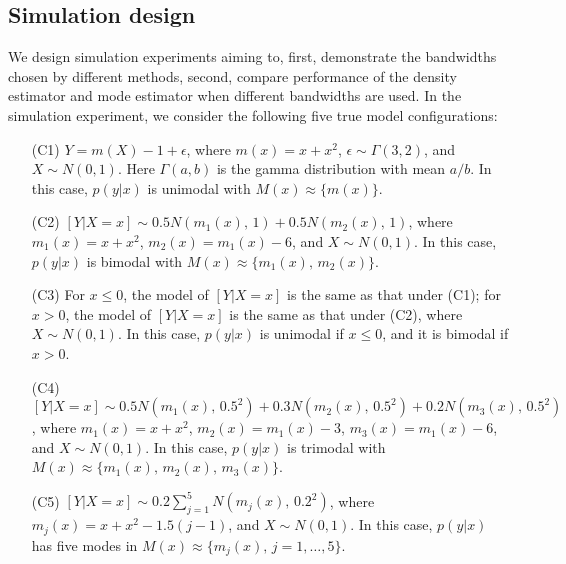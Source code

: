 \documentclass[fleqn,12pt,twoside]{article}
\numberwithin{equation}{section}
\begin{document}
\subsection{Simulation design}
We design simulation experiments aiming to, first, demonstrate the bandwidths chosen by different methods, second, compare performance of the density estimator and mode estimator when different bandwidths are used. In the simulation experiment, we consider the following five true model configurations: 
\begin{enumerate}
	\item[(C1)] $Y = m(X)-1+\epsilon$, where $m(x)=x+x^2$, $\epsilon\sim\Gamma(3,2)$, and $X\sim N(0, 1)$. Here $\Gamma(a,b)$ is the gamma distribution with mean $a/b$. In this case, $p(y|x)$ is unimodal with $ M(x) \approx \{m(x)\}$.
	\item[(C2)] $[Y|X=x] \sim 0.5N\left(m_1(x), \, 1\right)+0.5N\left(m_2(x), \, 1\right)$, where $m_1(x)=x+x^2$, $m_2(x)=m_1(x)-6$, and $X\sim N(0,1)$. In this case, $p(y|x)$ is bimodal with $M(x) \approx \{m_1(x), \, m_2(x)\}$.
	\item[(C3)] For $x \le 0$, the model of $[Y|X=x]$ is the same as that under (C1); for $x>0$, the model of $[Y|X=x]$ is the same as that under (C2), where $X\sim N(0,1)$. In this case, $p(y|x)$ is unimodal if $x\leq 0$, and it is bimodal if $x>0$.
	\item[(C4)] $[Y|X=x] \sim 0.5N\left(m_1(x), \, 0.5^2\right)+0.3N\left(m_2(x), \, 0.5^2\right)+0.2N\left(m_3(x), \, 0.5^2\right)$, where $m_1(x)=x+x^2$, $m_2(x)=m_1(x)-3$, $m_3(x)=m_1(x)-6$, and $X\sim N(0,1)$. In this case, $p(y|x)$ is trimodal with $M(x) \approx \{m_1(x), \, m_2(x), \, m_3(x)\}$.
	\item[(C5)] $[Y|X=x] \sim 0.2 \sum_{j=1}^{5} N\left(m_j(x), \, 0.2^2\right)$, where $m_j(x)=x+x^2-1.5(j-1)$, and $X\sim N(0,1)$. In this case, $p(y|x)$ has five modes in $M(x) \approx \{m_j(x), \, j=1,\ldots, 5\}$.
\end{enumerate}
\end{document}
